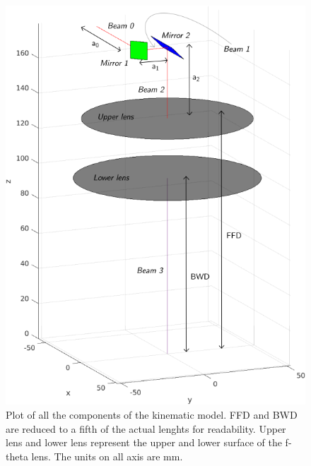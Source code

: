 \begin{figure}[p]
    \centering
    \includegraphics[width=\linewidth]{Pictures/kin-model.png}
    \caption{Plot of all the components of the kinematic model. FFD and BWD are reduced to a fifth of the actual lenghts for readability. Upper lens and lower lens represent the upper and lower surface of the f-theta lens. The units on all axis are mm.}
    \label{fig:kin-model}
\end{figure}

